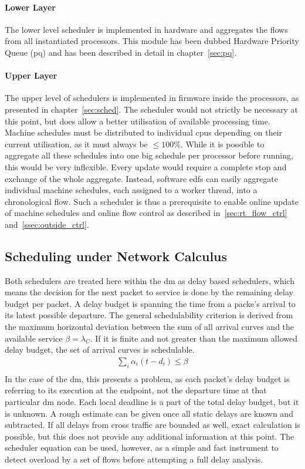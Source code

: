 \paragraph{Lower Layer}
The lower level scheduler is implemented in hardware and aggregates the flows from all instantiated processors.
This module has been dubbed Hardware Priority Queue (\gls{pq}) and has been described in detail in chapter~\ref{sec:pq}.
\paragraph{Upper Layer}
The upper level of schedulers is implemented in firmware inside the processors, as presented in chapter~\ref{sec:sched}.
The scheduler would not strictly be necessary at this point, but does allow a better utilisation of available processing time.
Machine schedules must be distributed to individual \gls{cpu}s depending on their current utilisation, as it must always
be $\le 100\%$. While it is possible to aggregate all these schedules into one big schedule per processor before running,
this would be very inflexible. Every update would require a complete stop and exchange of the whole aggregate.
Instead, software \gls{edf}s can easily aggregate individual machine schedules, each assigned to a worker thread, into a chronological flow.
Such a scheduler is thus a prerequisite to enable online update of machine schedules and online flow control as described in~\ref{sec:rt_flow_ctrl} and~\ref{ssec:outside_ctrl}.

\subsection{Scheduling under Network Calculus}
Both schedulers are treated here within the \gls{dm} as delay based schedulers, which means the decision for the next packet to service is done
by the remaining delay budget per packet. A delay budget is spanning the time from a packe's arrival to its latest possible departure.
The general schedulability criterion is derived from the maximum horizontal deviation between the sum of all arrival curves and the available service $\beta = \lambda_C$.
If it is finite and not greater than the maximum allowed delay budget, the set of arrival curves is schedulable.
%
\begin{equation}
\begin{aligned}
\sum_i \alpha_i(t-d_i) \le \beta\\
\label{eq:min_d}
\end{aligned}
\end{equation}
%
In the case of the \gls{dm}, this presents a problem, as each packet's delay budget is referring to its execution at the endpoint, not the departure time at that particular \gls{dm} node.
Each local deadline is a part of the total delay budget, but it is unknown. A rough estimate can be given once all static delays are known and subtracted. If all delays from cross traffic
are bounded as well, exact calculation is possible, but this does not provide any additional information at this point. The scheduler equation can be used, however, as a simple and fast instrument to detect overload
by a set of flows before attempting a full delay analysis.

